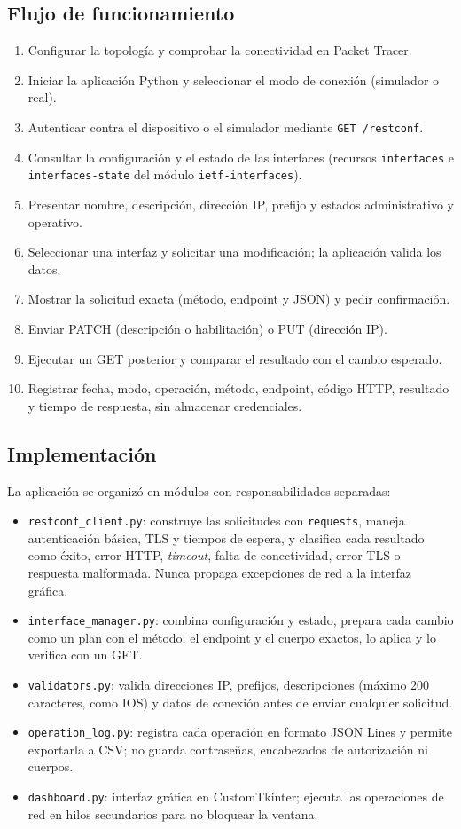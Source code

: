 \subsection{Flujo de funcionamiento}
\begin{enumerate}
  \item Configurar la topología y comprobar la conectividad en Packet Tracer.
  \item Iniciar la aplicación Python y seleccionar el modo de conexión (simulador o real).
  \item Autenticar contra el dispositivo o el simulador mediante \texttt{GET /restconf}.
  \item Consultar la configuración y el estado de las interfaces (recursos \texttt{interfaces} e \texttt{interfaces-state} del módulo \texttt{ietf-interfaces}).
  \item Presentar nombre, descripción, dirección IP, prefijo y estados administrativo y operativo.
  \item Seleccionar una interfaz y solicitar una modificación; la aplicación valida los datos.
  \item Mostrar la solicitud exacta (método, endpoint y JSON) y pedir confirmación.
  \item Enviar PATCH (descripción o habilitación) o PUT (dirección IP).
  \item Ejecutar un GET posterior y comparar el resultado con el cambio esperado.
  \item Registrar fecha, modo, operación, método, endpoint, código HTTP, resultado y tiempo de respuesta, sin almacenar credenciales.
\end{enumerate}

\subsection{Implementación}
La aplicación se organizó en módulos con responsabilidades separadas:
\begin{itemize}
  \item \texttt{restconf\_client.py}: construye las solicitudes con \texttt{requests}, maneja autenticación básica, TLS y tiempos de espera, y clasifica cada resultado como éxito, error HTTP, \textit{timeout}, falta de conectividad, error TLS o respuesta malformada. Nunca propaga excepciones de red a la interfaz gráfica.
  \item \texttt{interface\_manager.py}: combina configuración y estado, prepara cada cambio como un plan con el método, el endpoint y el cuerpo exactos, lo aplica y lo verifica con un GET.
  \item \texttt{validators.py}: valida direcciones IP, prefijos, descripciones (máximo 200 caracteres, como IOS) y datos de conexión antes de enviar cualquier solicitud.
  \item \texttt{operation\_log.py}: registra cada operación en formato JSON Lines y permite exportarla a CSV; no guarda contraseñas, encabezados de autorización ni cuerpos.
  \item \texttt{dashboard.py}: interfaz gráfica en CustomTkinter; ejecuta las operaciones de red en hilos secundarios para no bloquear la ventana.
\end{itemize}

